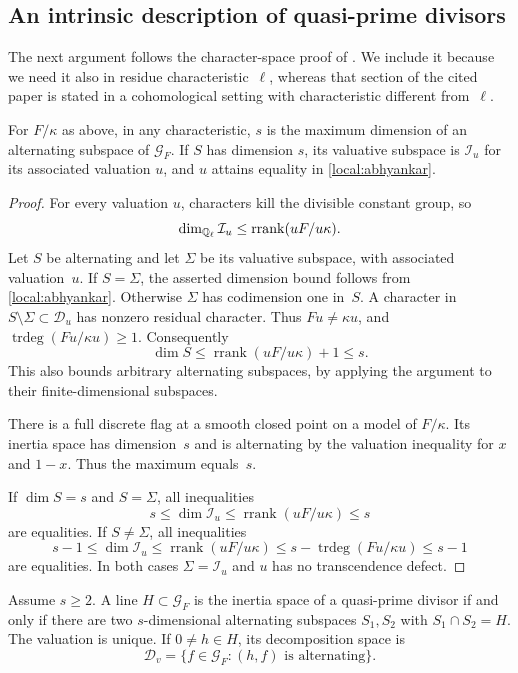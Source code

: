 \subsection{An intrinsic description of quasi-prime divisors}

The next argument follows the character-space proof of
\cite[Fact~3.2 and Theorem~3.3]{Topaz2019}.  We include it because we
need it also in residue characteristic~$\ell$, whereas that section
of the cited paper is stated in a cohomological setting with
characteristic different from~$\ell$.

\begin{lemma}\label{local:dimension}
For $F/\kappa$ as above, in any characteristic, $s$ is the maximum
dimension of an alternating subspace of $\mathcal G_F$.
If $S$ has dimension $s$, its valuative subspace is
$\mathcal I_u$ for its associated valuation $u$, and $u$ attains
equality in \eqref{local:abhyankar}.
\end{lemma}

\begin{proof}
For every valuation $u$, characters kill the divisible constant group,
so
\[
 \dim_{\mathbb Q_\ell}\mathcal I_u
 \leq\operatorname{rrank}(uF/u\kappa).
\]
Let $S$ be alternating and let $\Sigma$ be its valuative subspace,
with associated valuation~$u$.  If $S=\Sigma$, the asserted dimension
bound follows from \eqref{local:abhyankar}.
Otherwise $\Sigma$ has codimension one in~$S$.
A character in $S\setminus\Sigma\subset\mathcal D_u$ has nonzero
residual character.  Thus $Fu\ne\kappa u$, and
$\operatorname{trdeg}(Fu/\kappa u)\geq1$.  Consequently
\[
 \dim S\leq\operatorname{rrank}(uF/u\kappa)+1\leq s.
\]
This also bounds arbitrary alternating subspaces, by applying the
argument to their finite-dimensional subspaces.

There is a full discrete flag at a smooth closed point on a model
of $F/\kappa$.  Its inertia space has dimension~$s$ and is
alternating by the valuation inequality for $x$ and $1-x$.
Thus the maximum equals~$s$.

If $\dim S=s$ and $S=\Sigma$, all inequalities
\[
 s\leq\dim\mathcal I_u
 \leq\operatorname{rrank}(uF/u\kappa)\leq s
\]
are equalities.  If $S\ne\Sigma$, all inequalities
\[
 s-1\leq\dim\mathcal I_u
 \leq\operatorname{rrank}(uF/u\kappa)
 \leq s-\operatorname{trdeg}(Fu/\kappa u)\leq s-1
\]
are equalities.  In both cases $\Sigma=\mathcal I_u$ and $u$ has
no transcendence defect.
\end{proof}

\begin{lemma}\label{local:quasiprime}
Assume $s\geq2$.  A line $H\subset\mathcal G_F$ is the inertia
space of a quasi-prime divisor if and only if there are two
$s$-dimensional alternating subspaces $S_1,S_2$ with
$S_1\cap S_2=H$.  The valuation is unique.  If $0\ne h\in H$, its
decomposition space is
\[
 \mathcal D_v=\{f\in\mathcal G_F:(h,f)\text{ is alternating}\}.
\]
\end{lemma}

